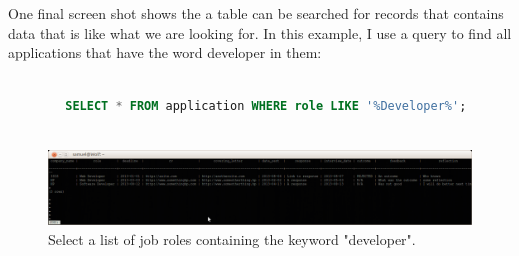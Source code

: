 \documentclass{article}
\begin{document}
One final screen shot shows the a table can be searched for records that contains data that is like what we are looking for. In this example, I use a query to find all applications that have the word developer in them:

\begin{center}
	\begin{lstlisting}[language=sql, showstringspaces=false]

		SELECT * FROM application WHERE role LIKE '%Developer%';
		
	\end{lstlisting}
\end{center}

\begin{figure}[H]
\centering
\includegraphics[width=1\textwidth]{img/test/test-like.png}
\caption{Select a list of job roles containing the keyword "developer".}
\label{fig:test-like}
\end{figure}
\end{document}

